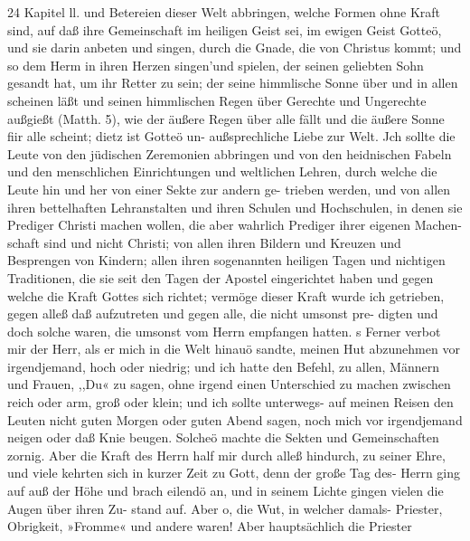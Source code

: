 24 Kapitel ll.
und Betereien dieser Welt abbringen, welche Formen ohne Kraft
sind, auf daß ihre Gemeinschaft im heiligen Geist sei, im ewigen
Geist Gotteö, und sie darin anbeten und singen, durch die Gnade,
die von Christus kommt; und so dem Herm in ihren Herzen
singen’und spielen, der seinen geliebten Sohn gesandt hat, um
ihr Retter zu sein; der seine himmlische Sonne über und in allen
scheinen läßt und seinen himmlischen Regen über Gerechte und
Ungerechte außgießt (Matth. 5), wie der äußere Regen über alle
fällt und die äußere Sonne fiir alle scheint; dietz ist Gotteö un-
außsprechliche Liebe zur Welt. Jch sollte die Leute von den
jüdischen Zeremonien abbringen und von den heidnischen Fabeln
und den menschlichen Einrichtungen und weltlichen Lehren, durch
welche die Leute hin und her von einer Sekte zur andern ge-
trieben werden, und von allen ihren bettelhaften Lehranstalten
und ihren Schulen und Hochschulen, in denen sie Prediger Christi
machen wollen, die aber wahrlich Prediger ihrer eigenen Machen-
schaft sind und nicht Christi; von allen ihren Bildern und Kreuzen
und Besprengen von Kindern; allen ihren sogenannten heiligen
Tagen und nichtigen Traditionen, die sie seit den Tagen der
Apostel eingerichtet haben und gegen welche die Kraft Gottes
sich richtet; vermöge dieser Kraft wurde ich getrieben, gegen
alleß daß aufzutreten und gegen alle, die nicht umsonst pre-
digten und doch solche waren, die umsonst vom Herrn empfangen
hatten. s
Ferner verbot mir der Herr, als er mich in die Welt hinauö
sandte, meinen Hut abzunehmen vor irgendjemand, hoch oder
niedrig; und ich hatte den Befehl, zu allen, Männern und Frauen,
,,Du« zu sagen, ohne irgend einen Unterschied zu machen zwischen
reich oder arm, groß oder klein; und ich sollte unterwegs- auf
meinen Reisen den Leuten nicht guten Morgen oder guten Abend
sagen, noch mich vor irgendjemand neigen oder daß Knie beugen.
Solcheö machte die Sekten und Gemeinschaften zornig. Aber die
Kraft des Herrn half mir durch alleß hindurch, zu seiner Ehre,
und viele kehrten sich in kurzer Zeit zu Gott, denn der große
Tag des- Herrn ging auf auß der Höhe und brach eilendö an,
und in seinem Lichte gingen vielen die Augen über ihren Zu-
stand auf.
Aber o, die Wut, in welcher damals- Priester, Obrigkeit,
»Fromme« und andere waren! Aber hauptsächlich die Priester


